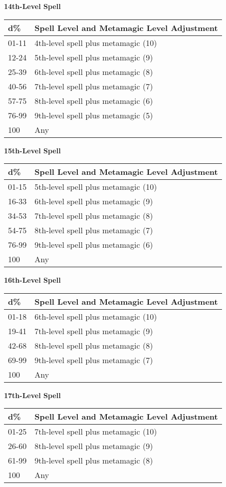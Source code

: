 \documentclass{article}
\begin{document}
\vspace{12pt}
\textbf{14th-Level Spell }

\begin{tabular}{|>{\raggedright}p{29pt}|>{\raggedright}p{201pt}|}
\hline
d\textbf{\%} & S\textbf{pell Level and Metamagic Level Adjustment }\tabularnewline
\hline
01-11 & 4th-level spell plus metamagic (10) \tabularnewline
\hline
12-24 & 5th-level spell plus metamagic (9) \tabularnewline
\hline
25-39 & 6th-level spell plus metamagic (8) \tabularnewline
\hline
40-56 & 7th-level spell plus metamagic (7) \tabularnewline
\hline
57-75 & 8th-level spell plus metamagic (6) \tabularnewline
\hline
76-99 & 9th-level spell plus metamagic (5) \tabularnewline
\hline
100 & Any\tabularnewline
\hline
\end{tabular}

\vspace{12pt}
\textbf{15th-Level Spell }

\begin{tabular}{|>{\raggedright}p{29pt}|>{\raggedright}p{201pt}|}
\hline
d\textbf{\%} & S\textbf{pell Level and Metamagic Level Adjustment }\tabularnewline
\hline
01-15 & 5th-level spell plus metamagic (10) \tabularnewline
\hline
16-33 & 6th-level spell plus metamagic (9) \tabularnewline
\hline
34-53 & 7th-level spell plus metamagic (8) \tabularnewline
\hline
54-75 & 8th-level spell plus metamagic (7) \tabularnewline
\hline
76-99 & 9th-level spell plus metamagic (6) \tabularnewline
\hline
100 & Any\tabularnewline
\hline
\end{tabular}

\vspace{12pt}
\textbf{16th-Level Spell }

\begin{tabular}{|>{\raggedright}p{29pt}|>{\raggedright}p{198pt}|}
\hline
d\textbf{\%} & S\textbf{pell Level and Metamagic Level Adjustment}\tabularnewline
\hline
01-18 & 6th-level spell plus metamagic (10) \tabularnewline
\hline
19-41 & 7th-level spell plus metamagic (9) \tabularnewline
\hline
42-68 & 8th-level spell plus metamagic (8) \tabularnewline
\hline
69-99 & 9th-level spell plus metamagic (7) \tabularnewline
\hline
100 & Any\tabularnewline
\hline
\end{tabular}

\vspace{12pt}
\textbf{17th-Level Spell }

\begin{tabular}{|>{\raggedright}p{29pt}|>{\raggedright}p{201pt}|}
\hline
d\textbf{\%} & S\textbf{pell Level and Metamagic Level Adjustment }\tabularnewline
\hline
01-25 & 7th-level spell plus metamagic (10) \tabularnewline
\hline
26-60 & 8th-level spell plus metamagic (9) \tabularnewline
\hline
61-99 & 9th-level spell plus metamagic (8) \tabularnewline
\hline
100 & Any\tabularnewline
\hline
\end{tabular}
\end{document}

